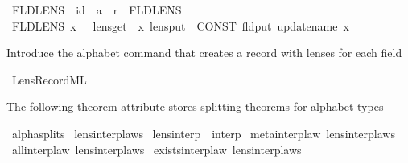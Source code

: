 \begin{isabellebody}
\isanewline
{}\isamarkupfalse%
\ {\isachardoublequoteopen}{\isacharunderscore}FLDLENS{\isachardoublequoteclose}\ {\isacharcolon}{\isacharcolon}\ {\isachardoublequoteopen}id\ {\isasymRightarrow}\ {\isacharparenleft}{\isacharprime}a\ {\isasymLongrightarrow}\ {\isacharprime}r{\isacharparenright}{\isachardoublequoteclose}\ \ {\isacharparenleft}{\isachardoublequoteopen}FLDLENS\ {\isacharunderscore}{\isachardoublequoteclose}{\isacharparenright}\isanewline
{}\isamarkupfalse%
\ {\isachardoublequoteopen}FLDLENS\ x{\isachardoublequoteclose}\ {\isacharequal}{\isachargreater}\ {\isachardoublequoteopen}{\isasymlparr}\ lens{\isacharunderscore}get\ {\isacharequal}\ x{\isacharcomma}\ lens{\isacharunderscore}put\ {\isacharequal}\ CONST\ fld{\isacharunderscore}put\ {\isacharparenleft}{\isacharunderscore}update{\isacharunderscore}name\ x{\isacharparenright}\ {\isasymrparr}{\isachardoublequoteclose}%
\begin{isamarkuptext}%
Introduce the alphabet command that creates a record with lenses for each field%
\end{isamarkuptext}\isamarkuptrue%
%
\isadelimML
%
\endisadelimML
%
\isatagML
{}\isamarkupfalse%
\ {\isachardoublequoteopen}Lens{\isacharunderscore}Record{\isachardot}ML{\isachardoublequoteclose}%
\endisatagML
{\isafoldML}%
%
\isadelimML
%
\endisadelimML
%
\begin{isamarkuptext}%
The following theorem attribute stores splitting theorems for alphabet types%
\end{isamarkuptext}\isamarkuptrue%
\isamarkupfalse%
\ alpha{\isacharunderscore}splits%
\isamarkuptrue%
\isamarkupfalse%
\ lens{\isacharunderscore}interp{\isacharunderscore}laws\isanewline
\isanewline
{}\isamarkupfalse%
\ lens{\isacharunderscore}interp\ {\isacharequal}\ interp\isanewline
{}\isanewline
{}\isamarkupfalse%
\ meta{\isacharunderscore}interp{\isacharunderscore}law\ {\isacharbrackleft}lens{\isacharunderscore}interp{\isacharunderscore}laws{\isacharbrackright}\isanewline
{}\isamarkupfalse%
\ all{\isacharunderscore}interp{\isacharunderscore}law\ {\isacharbrackleft}lens{\isacharunderscore}interp{\isacharunderscore}laws{\isacharbrackright}\isanewline
{}\isamarkupfalse%
\ exists{\isacharunderscore}interp{\isacharunderscore}law\ {\isacharbrackleft}lens{\isacharunderscore}interp{\isacharunderscore}laws{\isacharbrackright}\isanewline
{}\isamarkupfalse%
\isanewline
%
\isadelimtheory
\isanewline
%
\endisadelimtheory
%
\isatagtheory
{}\isamarkupfalse%
%
\endisatagtheory
{\isafoldtheory}%
%
\isadelimtheory
%
\endisadelimtheory
%
\end{isabellebody}%
